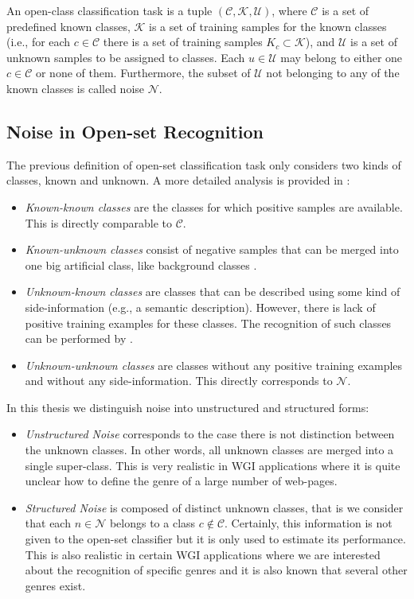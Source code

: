An open-class classification task is a tuple $(\mathcal{C},\mathcal{K},\mathcal{U})$, where $\mathcal{C}$ is a set of predefined known classes, $\mathcal{K}$ is a set of training samples for the known classes (i.e., for each $c \in \mathcal{C}$ there is a set of training samples $K_c \subset \mathcal{K}$), and $\mathcal{U}$ is a set of unknown samples to be assigned to classes. Each $u \in \mathcal{U}$ may belong to either one $c \in \mathcal{C}$ or none of them. Furthermore, the subset of $\mathcal{U}$ not belonging to any of the known classes is called noise $\mathcal{N}$.  

\subsection{Noise in Open-set Recognition}
\label{chap:openset:sec:Noise_definition}

The previous definition of open-set classification task only considers two kinds of classes, known and unknown. A more detailed analysis is provided in \parencite{geng2018recent}:

\begin{itemize}
    \item \textit{Known-known classes} are the classes for which positive samples are available. This is directly comparable to $\mathcal{C}$.
    \item \textit{Known-unknown classes} consist of negative samples that can be merged into one big artificial class, like background classes .
    \item \textit{Unknown-known classes} are classes that can be described using some kind of side-information (e.g., a semantic description). However, there is lack of positive training examples for these classes. The recognition of such classes can be performed by  .
    \item \textit{Unknown-unknown classes} are classes without any positive training examples and without any side-information. This directly corresponds to $\mathcal{N}$. 
\end{itemize}

In this thesis we distinguish noise into unstructured and structured forms:

\begin{itemize}
    \item \textit{Unstructured Noise} corresponds to the case there is not distinction between the unknown classes. In other words, all unknown classes are merged into a single super-class. This is very realistic in WGI applications where it is quite unclear how to define the genre of a large number of web-pages.
    \item \textit{Structured Noise} is composed of distinct unknown classes,  that is we consider that each $n \in \mathcal{N}$ belongs to a class $c \notin \mathcal{C}$. Certainly, this information is not given to the open-set classifier but it is only used to estimate its performance. This is also realistic in certain WGI applications where we are interested about the recognition of specific genres and it is also known that several other genres exist.
\end{itemize}

